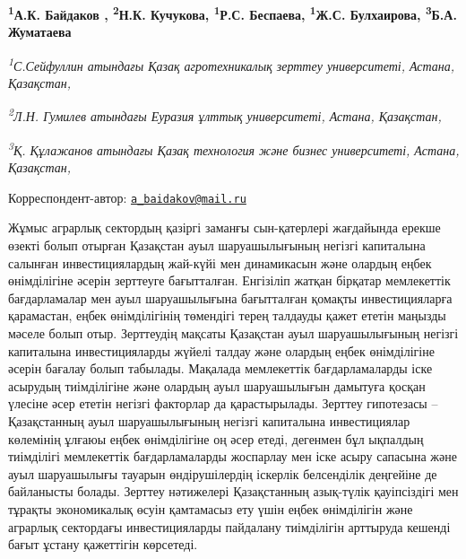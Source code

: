 
\begin{articleheader}

{\bfseries
\textsuperscript{1}А.К. Байдаков\textsuperscript{\envelope } \authorid,
\textsuperscript{2}Н.К. Кучукова\authorid,
\textsuperscript{1}Р.С. Беспаева\authorid,
\textsuperscript{1}Ж.С. Булхаирова\authorid,
\textsuperscript{3}Б.А. Жуматаева\authorid}
\end{articleheader}

\begin{affiliation}
\emph{\textsuperscript{1}С.Сейфуллин атындағы Қазақ агротехникалық зерттеу университеті, Астана, Қазақстан,}

\emph{\textsuperscript{2}Л.Н. Гумилев атындағы Еуразия ұлттық университеті, Астана, Қазақстан,}

\emph{\textsuperscript{3}Қ. Құлажанов атындағы Қазақ технология және бизнес университеті, Астана, Қазақстан,}

\raggedright \textsuperscript{\envelope }Корреспондент-автор: \href{mailto:a_baidakov@mail.ru}{\nolinkurl{a\_baidakov@mail.ru}}
\end{affiliation}

Жұмыс аграрлық сектордың қазіргі заманғы сын-қатерлері жағдайында ерекше
өзекті болып отырған Қазақстан ауыл шаруашылығының негізгі капиталына
салынған инвестициялардың жай-күйі мен динамикасын және олардың еңбек
өнімділігіне әсерін зерттеуге бағытталған. Енгізіліп жатқан бірқатар
мемлекеттік бағдарламалар мен ауыл шаруашылығына бағытталған қомақты
инвестицияларға қарамастан, еңбек өнімділігінің төмендігі терең талдауды
қажет ететін маңызды мәселе болып отыр. Зерттеудің мақсаты Қазақстан
ауыл шаруашылығының негізгі капиталына инвестицияларды жүйелі талдау
және олардың еңбек өнімділігіне әсерін бағалау болып табылады. Мақалада
мемлекеттік бағдарламаларды іске асырудың тиімділігіне және олардың ауыл
шаруашылығын дамытуға қосқан үлесіне әсер ететін негізгі факторлар да
қарастырылады. Зерттеу гипотезасы -- Қазақстанның ауыл шаруашылығының
негізгі капиталына инвестициялар көлемінің ұлғаюы еңбек өнімділігіне оң
әсер етеді, дегенмен бұл ықпалдың тиімділігі мемлекеттік бағдарламаларды
жоспарлау мен іске асыру сапасына және ауыл шаруашылығы тауарын
өндірушілердің іскерлік белсенділік деңгейіне де байланысты болады.
Зерттеу нәтижелері Қазақстанның азық-түлік қауіпсіздігі мен тұрақты
экономикалық өсуін қамтамасыз ету үшін еңбек өнімділігін және аграрлық
сектордағы инвестицияларды пайдалану тиімділігін арттыруда кешенді бағыт
ұстану қажеттігін көрсетеді.

